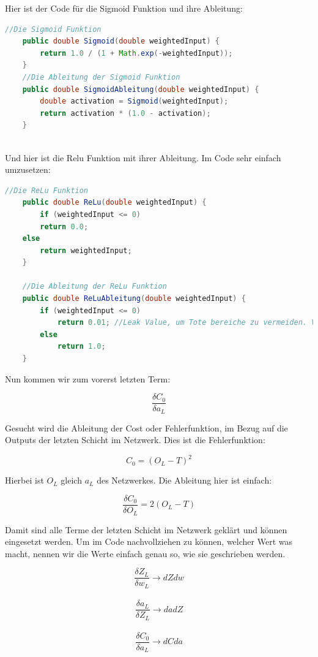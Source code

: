 \documentclass[12pt]{article}
\begin{document}
Hier ist der Code für die Sigmoid Funktion und ihre Ableitung:
\begin{lstlisting}[language=Java] 
    //Die Sigmoid Funktion
    public double Sigmoid(double weightedInput) {
        return 1.0 / (1 + Math.exp(-weightedInput));
    }
    //Die Ableitung der Sigmoid Funktion
    public double SigmoidAbleitung(double weightedInput) {
        double activation = Sigmoid(weightedInput);
        return activation * (1.0 - activation);
    }
    
\end{lstlisting} 

Und hier ist die Relu Funktion mit ihrer Ableitung. Im Code sehr einfach umzusetzen:

\begin{lstlisting}[language=Java] 
    //Die ReLu Funktion
    public double ReLu(double weightedInput) {
        if (weightedInput <= 0)
        return 0.0;
    else
        return weightedInput;
    }
        
    //Die Ableitung der ReLu Funktion
    public double ReLuAbleitung(double weightedInput) {
        if (weightedInput <= 0)
            return 0.01; //Leak Value, um Tote bereiche zu vermeiden. Vermutlich bei Sigmoid kein Problem
        else
            return 1.0;
    }
\end{lstlisting} 

Nun kommen wir zum vorerst letzten Term:

$$\frac{\delta C_0}{\delta a_L}$$

Gesucht wird die Ableitung der Cost oder Fehlerfunktion, im Bezug auf die Outputs der letzten Schicht im Netzwerk. Dies ist die Fehlerfunktion:

$$C_0 = (O_L - T)^2$$

Hierbei ist $O_L$ gleich $a_L$ des Netzwerkes.
Die Ableitung hier ist einfach:

$$\frac{\delta C_0}{\delta O_L} = 2(O_L - T)$$

Damit sind alle Terme der letzten Schicht im Netzwerk geklärt und können eingesetzt werden.
Um im Code nachvollziehen zu können, welcher Wert was macht, nennen wir die Werte einfach genau so, wie sie geschrieben werden.


$$\frac{\delta Z_L}{\delta w_L} \rightarrow dZdw $$ \\
$$\frac{\delta a_L}{\delta Z_L} \rightarrow dadZ $$ \\
$$\frac{\delta C_0}{\delta a_L} \rightarrow dCda $$ \\
\end{document}
